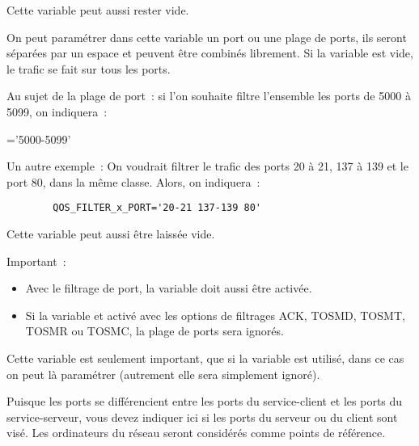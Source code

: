 \begin{description}
    Cette variable peut aussi rester vide.

    \sloppypar{}


    On peut paramétrer dans cette variable un port ou une plage de ports,
    ils seront séparées par un espace et peuvent être combinés librement. Si
    la variable est vide, le trafic se fait sur tous les ports.

    Au sujet de la plage de port~: si l'on souhaite filtre l'ensemble
    les ports de 5000 à 5099, on indiquera~:

='5000-5099'

    Un autre exemple~: On voudrait filtrer le trafic des ports 20 à 21,
    137 à 139 et le port 80, dans la même classe. Alors, on indiquera~:

\begin{example}
\begin{verbatim}
        QOS_FILTER_x_PORT='20-21 137-139 80'
\end{verbatim}
\end{example}

    Cette variable peut aussi être laissée vide.

   Important~:
   \begin{itemize}
   \item Avec le filtrage de port, la variable 
    doit aussi être activée.

   \item Si la variable  et activé
    avec les options de filtrages ACK, TOSMD, TOSMT, TOSMR ou TOSMC,
    la plage de ports sera ignorés.
    \end{itemize}


    Cette variable est seulement important, que si la variable 
    est utilisé, dans ce cas on peut là paramétrer (autrement elle sera
    simplement ignoré).

    Puisque les ports se différencient entre les ports du service-client
    et les ports du service-serveur, vous devez indiquer ici si les ports du
    serveur ou du client sont visé. Les ordinateurs du réseau seront considérés
    comme points de référence.


\end{description}
